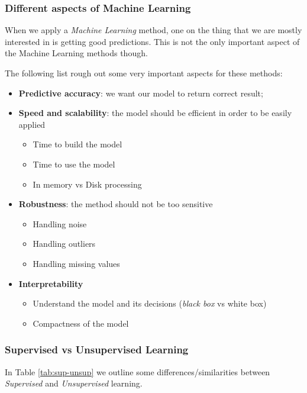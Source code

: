 \subsubsection{Different aspects of Machine Learning} 

When we apply a \emph{Machine Learning} method, one on the thing that we are mostly interested in is getting good predictions. This is not the only important aspect of the Machine Learning methods though. 

The following list rough out some very important aspects for these methods:

\begin{itemize}
\item \textbf{Predictive accuracy}: we want our model to return correct result;
\item \textbf{Speed and scalability}: the model should be efficient in order to be easily applied
  \begin{itemize}
   \item Time to build the model
   \item Time to use the model
   \item In memory vs Disk processing
  \end{itemize}
\item \textbf{Robustness}: the method should not be too sensitive
  \begin{itemize}
   \item Handling noise
   \item Handling outliers
   \item Handling missing values
  \end{itemize}
\item \textbf{Interpretability}
  \begin{itemize}
   \item Understand the model and its decisions (\emph{black box} vs {white box})
   \item Compactness of the model
  \end{itemize}
\end{itemize}

\subsubsection{Supervised vs Unsupervised Learning}

In Table \ref{tab:sup-unsup} we outline some differences/similarities between \emph{Supervised} and \emph{Unsupervised} learning. 

